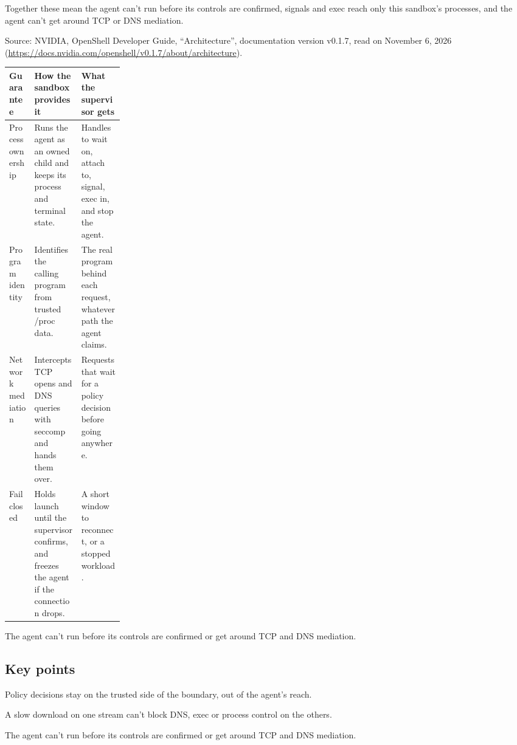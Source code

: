 Together these mean the agent can't run before its controls are confirmed, signals and exec reach only this sandbox's processes, and the agent can't get around TCP or DNS mediation.

Source: NVIDIA, OpenShell Developer Guide, ``Architecture'', documentation version v0.1.7, read on November 6, 2026 (\url{https://docs.nvidia.com/openshell/v0.1.7/about/architecture}).

\begin{center}\footnotesize
\begin{tabularx}{\linewidth}{L{0.22\linewidth}XX}
\toprule
\textbf{Guarantee} & \textbf{How the sandbox provides it} & \textbf{What the supervisor gets} \\
\midrule
Process ownership & Runs the agent as an owned child and keeps its process and terminal state. & Handles to wait on, attach to, signal, exec in, and stop the agent. \\
Program identity & Identifies the calling program from trusted /proc data. & The real program behind each request, whatever path the agent claims. \\
Network mediation & Intercepts TCP opens and DNS queries with seccomp and hands them over. & Requests that wait for a policy decision before going anywhere. \\
Fail closed & Holds launch until the supervisor confirms, and freezes the agent if the connection drops. & A short window to reconnect, or a stopped workload. \\
\bottomrule
\end{tabularx}
\end{center}

\begin{takeaway}The agent can't run before its controls are confirmed or get around TCP and DNS mediation.\end{takeaway}

\subsection*{Key points}
\bi
\item Policy decisions stay on the trusted side of the boundary, out of the agent's reach.
\item A slow download on one stream can't block DNS, exec or process control on the others.
\item The agent can't run before its controls are confirmed or get around TCP and DNS mediation.
\ei
